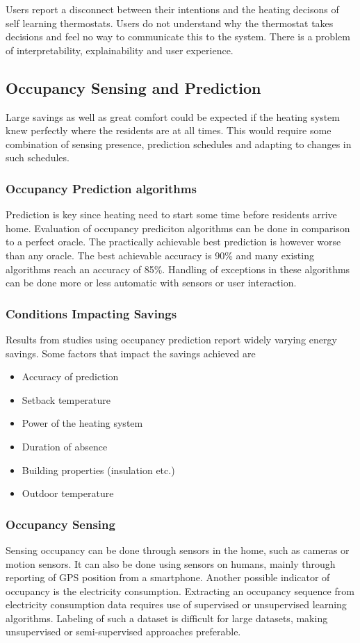 Users report a disconnect between their intentions and the heating decisons of self learning thermostats.
Users do not understand why the thermostat takes decisions and feel no way to communicate this to the system.
There is a problem of interpretability, explainability and user experience.

\subsection{Occupancy Sensing and Prediction}
Large savings as well as great comfort could be expected if the heating system knew perfectly where the residents are at all times.
This would require some combination of sensing presence, prediction schedules and adapting to changes in such schedules.

\subsubsection{Occupancy Prediction algorithms}
Prediction is key since heating need to start some time before residents arrive home.
Evaluation of occupancy prediciton algorithms can be done in comparison to a perfect oracle.
The practically achievable best prediction is however worse than any oracle.
The best achievable accuracy is 90\% and many existing algorithms reach an accuracy of 85\%.
Handling of exceptions in these algorithms can be done more or less automatic with sensors or user interaction.

\subsubsection{Conditions Impacting Savings}
Results from studies using occupancy prediction report widely varying energy savings.
Some factors that impact the savings achieved are

\begin{itemize}
    \item Accuracy of prediction
    \item Setback temperature
    \item Power of the heating system
    \item Duration of absence
    \item Building properties (insulation etc.)
    \item Outdoor temperature
\end{itemize}

\subsubsection{Occupancy Sensing}
Sensing occupancy can be done through sensors in the home, such as cameras or motion sensors.
It can also be done using sensors on humans, mainly through reporting of GPS position from a smartphone.
Another possible indicator of occupancy is the electricity consumption.
Extracting an occupancy sequence from electricity consumption data requires use of supervised or unsupervised learning algorithms.
Labeling of such a dataset is difficult for large datasets, making unsupervised or semi-supervised approaches preferable.

